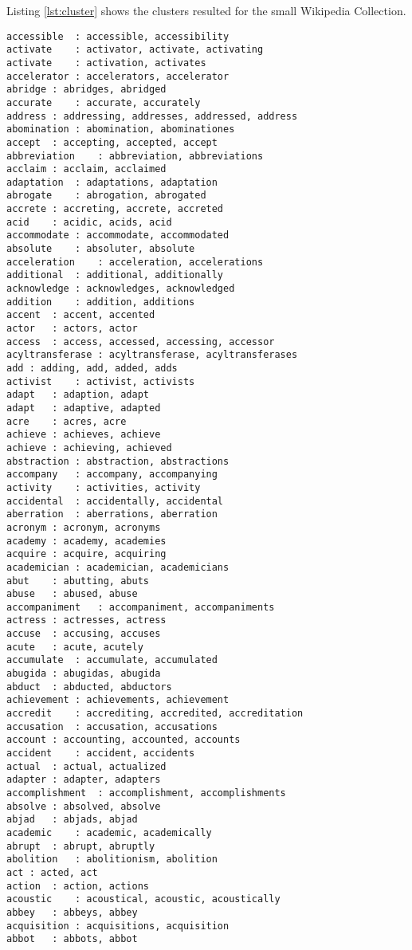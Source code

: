 \documentclass[letterpaper,11pt]{article}
\begin{document}
Listing \ref{lst:cluster} shows the clusters resulted for the small Wikipedia Collection. 

\begin{lstlisting}[caption={Cluster for the small wikipedia collection}, label={lst:cluster}]
accessible	: accessible, accessibility	
activate	: activator, activate, activating
activate	: activation, activates
accelerator	: accelerators, accelerator
abridge	: abridges, abridged
accurate	: accurate, accurately
address	: addressing, addresses, addressed, address
abomination	: abomination, abominationes
accept	: accepting, accepted, accept
abbreviation	: abbreviation, abbreviations
acclaim	: acclaim, acclaimed
adaptation	: adaptations, adaptation
abrogate	: abrogation, abrogated
accrete	: accreting, accrete, accreted
acid	: acidic, acids, acid
accommodate	: accommodate, accommodated
absolute	: absoluter, absolute
acceleration	: acceleration, accelerations
additional	: additional, additionally
acknowledge	: acknowledges, acknowledged
addition	: addition, additions
accent	: accent, accented
actor	: actors, actor
access	: access, accessed, accessing, accessor
acyltransferase	: acyltransferase, acyltransferases
add	: adding, add, added, adds
activist	: activist, activists
adapt	: adaption, adapt
adapt	: adaptive, adapted
acre	: acres, acre
achieve	: achieves, achieve
achieve	: achieving, achieved
abstraction	: abstraction, abstractions
accompany	: accompany, accompanying
activity	: activities, activity
accidental	: accidentally, accidental
aberration	: aberrations, aberration
acronym	: acronym, acronyms
academy	: academy, academies
acquire	: acquire, acquiring
academician	: academician, academicians
abut	: abutting, abuts
abuse	: abused, abuse
accompaniment	: accompaniment, accompaniments
actress	: actresses, actress
accuse	: accusing, accuses
acute	: acute, acutely
accumulate	: accumulate, accumulated
abugida	: abugidas, abugida
abduct	: abducted, abductors
achievement	: achievements, achievement
accredit	: accrediting, accredited, accreditation
accusation	: accusation, accusations
account	: accounting, accounted, accounts
accident	: accident, accidents
actual	: actual, actualized
adapter	: adapter, adapters
accomplishment	: accomplishment, accomplishments
absolve	: absolved, absolve
abjad	: abjads, abjad
academic	: academic, academically
abrupt	: abrupt, abruptly
abolition	: abolitionism, abolition
act	: acted, act
action	: action, actions
acoustic	: acoustical, acoustic, acoustically
abbey	: abbeys, abbey
acquisition	: acquisitions, acquisition
abbot	: abbots, abbot

\end{lstlisting}
\end{document}
